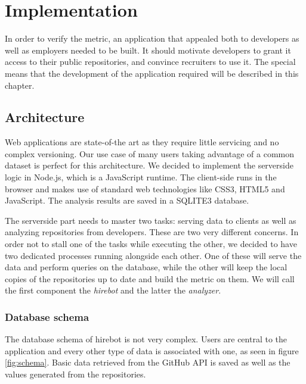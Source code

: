 \chapter{Implementation}\label{ch:implementation}
In order to verify the metric, an application that appealed both to developers as well as employers needed to be built. It should motivate developers to grant it access to their public repositories, and convince recruiters to use it. The special means that the development of the application required will be described in this chapter.

\section{Architecture}
Web applications are state-of-the art as they require little servicing and no complex versioning. Our use case of many users taking advantage of a common dataset is perfect for this architecture. We decided to implement the serverside logic in Node.js, which is a JavaScript runtime. The client-side runs in the browser and makes use of standard web technologies like CSS3, HTML5 and JavaScript. The analysis results are saved in a SQLITE3 database.
\newline

The serverside part needs to master two tasks: serving data to clients as well as analyzing repositories from developers. These are two very different concerns. In order not to stall one of the tasks while executing the other, we decided to have two dedicated processes running alongside each other. One of these will serve the data and perform queries on the database, while the other will keep the local copies of the repositories up to date and build the metric on them. We will call the first component the \textit{hirebot} and the latter the \textit{analyzer}.

\subsection{Database schema}
The database schema of hirebot is not very complex. Users are central to the application and every other type of data is associated with one, as seen in figure \ref{fig:schema}. Basic data retrieved from the GitHub API is saved as well as the values generated from the repositories.

